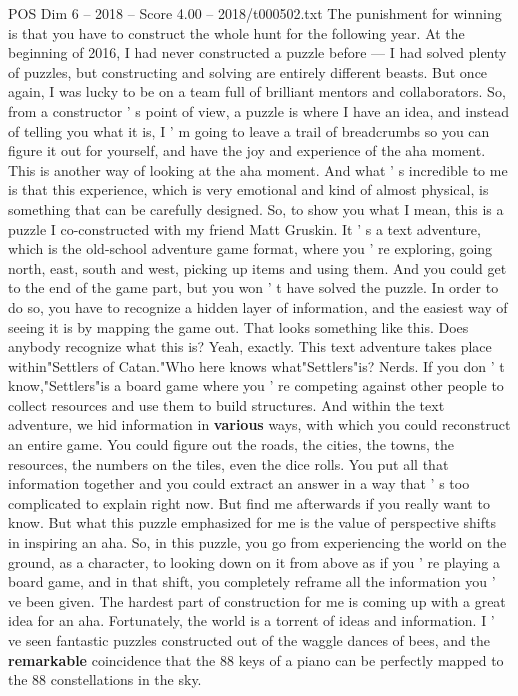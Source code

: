 \begin{textsample}{POS Dim 6 – 2018 – Score 4.00 – 2018/t000502.txt}
The punishment for winning is that you have to construct the whole hunt for the following year.
At the beginning of 2016, I had never constructed a puzzle before — I had solved plenty of puzzles, but constructing and solving are entirely different beasts.
But once again, I was lucky to be on a team full of brilliant mentors and collaborators.
So, from a constructor ' s point of view, a puzzle is where I have an idea, and instead of telling you what it is, I ' m going to leave a trail of breadcrumbs so you can figure it out for yourself, and have the joy and experience of the aha moment.
This is another way of looking at the aha moment.
And what ' s incredible to me is that this experience, which is very emotional and kind of almost physical, is something that can be carefully designed.
So, to show you what I mean, this is a puzzle I co-constructed with my friend Matt Gruskin.
It ' s a text adventure, which is the old-school adventure game format, where you ' re exploring, going north, east, south and west, picking up items and using them.
And you could get to the end of the game part, but you won ' t have solved the puzzle.
In order to do so, you have to recognize a hidden layer of information, and the easiest way of seeing it is by mapping the game out.
That looks something like this.
Does anybody recognize what this is?
Yeah, exactly.
This text adventure takes place within"Settlers of Catan."Who here knows what"Settlers"is?
Nerds.
If you don ' t know,"Settlers"is a board game where you ' re competing against other people to collect resources and use them to build structures.
And within the text adventure, we hid information in \textbf{various} ways, with which you could reconstruct an entire game.
You could figure out the roads, the cities, the towns, the resources, the numbers on the tiles, even the dice rolls.
You put all that information together and you could extract an answer in a way that ' s too complicated to explain right now.
But find me afterwards if you really want to know.
But what this puzzle emphasized for me is the value of perspective shifts in inspiring an aha.
So, in this puzzle, you go from experiencing the world on the ground, as a character, to looking down on it from above as if you ' re playing a board game, and in that shift, you completely reframe all the information you ' ve been given.
The hardest part of construction for me is coming up with a great idea for an aha.
Fortunately, the world is a torrent of ideas and information.
I ' ve seen fantastic puzzles constructed out of the waggle dances of bees, and the \textbf{remarkable} coincidence that the 88 keys of a piano can be perfectly mapped to the 88 constellations in the sky.

\end{textsample}
